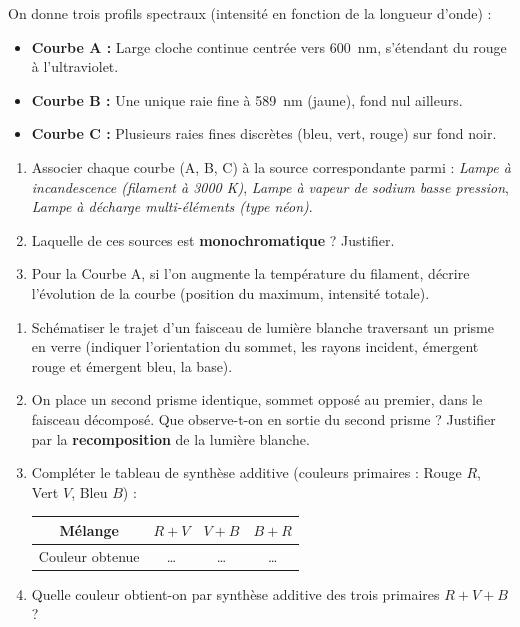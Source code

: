 \documentclass[11pt]{article}
\begin{document}
\begin{exercice}
On donne trois profils spectraux (intensité en fonction de la longueur d'onde) :
\begin{itemize}
    \item \textbf{Courbe A :} Large cloche continue centrée vers \SI{600}{\nano\meter}, s'étendant du rouge à l'ultraviolet.
    \item \textbf{Courbe B :} Une unique raie fine à \SI{589}{\nano\meter} (jaune), fond nul ailleurs.
    \item \textbf{Courbe C :} Plusieurs raies fines discrètes (bleu, vert, rouge) sur fond noir.
\end{itemize}
\begin{enumerate}
    \item Associer chaque courbe (A, B, C) à la source correspondante parmi : \textit{Lampe à incandescence (filament à 3000 K)}, \textit{Lampe à vapeur de sodium basse pression}, \textit{Lampe à décharge multi-éléments (type néon)}.
    \item Laquelle de ces sources est \textbf{monochromatique} ? Justifier.
    \item Pour la Courbe A, si l'on augmente la température du filament, décrire l'évolution de la courbe (position du maximum, intensité totale).
\end{enumerate}
\end{exercice}

\begin{exercice}
\begin{enumerate}
    \item Schématiser le trajet d'un faisceau de lumière blanche traversant un prisme en verre (indiquer l'orientation du sommet, les rayons incident, émergent rouge et émergent bleu, la base).
    \item On place un second prisme identique, sommet opposé au premier, dans le faisceau décomposé. Que observe-t-on en sortie du second prisme ? Justifier par la \textbf{recomposition} de la lumière blanche.
    \item Compléter le tableau de synthèse additive (couleurs primaires : Rouge $R$, Vert $V$, Bleu $B$) :
    \begin{center}
    \begin{tabular}{|c|c|c|c|}
    \hline
    Mélange & $R + V$ & $V + B$ & $B + R$ \\ \hline
    Couleur obtenue & \dots & \dots & \dots \\ \hline
    \end{tabular}
    \end{center}
    \item Quelle couleur obtient-on par synthèse additive des trois primaires $R+V+B$ ?
\end{enumerate}
\end{exercice}
\end{document}
